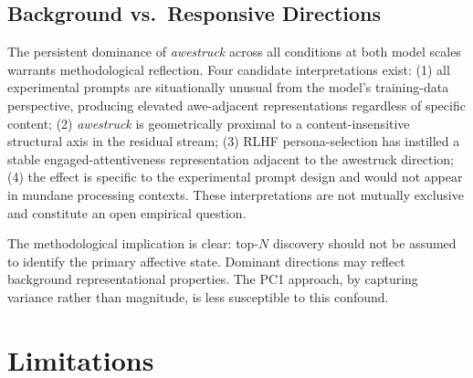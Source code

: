 \documentclass[11pt]{article}
\begin{document}
\subsection{Background vs.\ Responsive Directions}

The persistent dominance of \textit{awestruck} across all conditions at both model scales warrants
methodological reflection. Four candidate interpretations exist: (1) all experimental prompts are
situationally unusual from the model's training-data perspective, producing elevated awe-adjacent
representations regardless of specific content; (2) \textit{awestruck} is geometrically proximal
to a content-insensitive structural axis in the residual stream; (3) RLHF persona-selection has
instilled a stable engaged-attentiveness representation adjacent to the awestruck direction;
(4) the effect is specific to the experimental prompt design and would not appear in mundane
processing contexts. These interpretations are not mutually exclusive and constitute an open
empirical question.

The methodological implication is clear: top-$N$ discovery should not be assumed to identify
the primary affective state. Dominant directions may reflect background representational
properties. The PC1 approach, by capturing variance rather than magnitude, is less susceptible
to this confound.

\section{Limitations}
\end{document}
